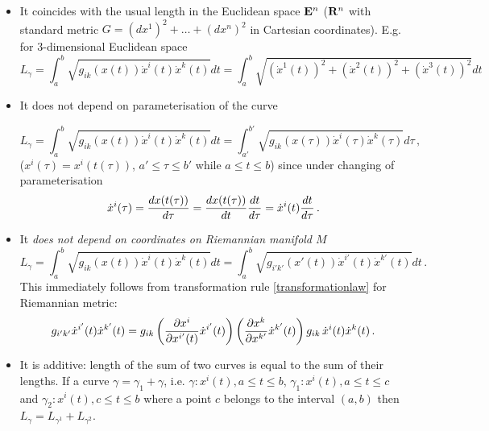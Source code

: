 \documentclass[12pt]{article}
\theoremstyle{theorem}
\numberwithin{equation}{section}
\begin{document}
\begin{itemize}

\item It coincides with the usual length in the Euclidean space ${\bf E}^n$
(${\bf R}^n$ with standard metric  $G=(dx^1)^2+\dots+(dx^n)^2$
in Cartesian coordinates). E.g. for $3$-dimensional Euclidean space
\begin{equation*}\label{coincidewithlength}
      L_\gamma=
  \int_a^b \sqrt {g_{ik}(x(t))\dot x^i(t) \dot x^k(t)}dt=
  \int_a^b \sqrt{(\dot x^1(t))^2+(\dot x^2(t))^2+(\dot x^3(t))^2}dt
\end{equation*}


\item It does not depend on parameterisation of the curve

\begin{equation*}\label{independenceon parameterisation}
    L_\gamma=  \int_a^b \sqrt {g_{ik}(x(t))\dot x^i(t) \dot x^k(t)}dt=
        \int_{a'}^{b'} \sqrt {g_{ik}(x(\tau))\dot x^i(\tau) \dot x^k(\tau)}
                 d\tau\,,
\end{equation*}
($x^i(\tau)=x^i(t(\tau))$,
$a'\leq \tau\leq b'$ while $a\leq t\leq b$) since under
changing of parameterisation
  $$
  \dot x^i(\tau)={dx(t(\tau))\over d\tau}=
  {dx(t(\tau))\over d t}{dt\over d\tau}=
  \dot x^i(t){dt\over d\tau}\,.
  $$


\item It {\it does not depend on coordinates on Riemannian manifold $M$}
 \begin{equation*}\label{independence on coordinates}
    L_\gamma=  \int_a^b \sqrt {g_{ik}(x(t))\dot x^i(t) \dot x^k(t)}dt=
    \int_a^b \sqrt {g_{i'k'}(x'(t))\dot x^{i'}(t) \dot x^{k'}(t)}dt\,.
 \end{equation*}
This immediately follows from transformation rule
\eqref{transformationlaw}  for Riemannian metric:
       $$
g_{i'k'}\dot x^{i'}(t) \dot x^{k'}(t)=
   g_{ik}
 \left({\partial x^i\over \partial x^{i'}(t)}\dot x^{i'}(t)\right)
 \left({\partial x^k\over \partial x^{k'}}\dot x^{k'}(t)\right)
    g_{ik}\,\dot x^{i}(t) \dot x^{k}(t)\,.
        $$
\item  It is additive: length of the sum of two curves is equal to the sum of
their lengths.
If a curve  $\gamma=\gamma_1+\gamma$, i.e.
$\gamma\colon x^i(t), a\leq t\leq b$,
$\gamma_1\colon x^i(t), a\leq t\leq c$ and
$\gamma_2\colon x^i(t), c\leq t\leq b$ where
a point $c$ belongs to the interval $(a,b)$ then
$L_{\gamma}=L_{\gamma^1}+L_{\gamma^2}$.

\end{itemize}
\end{document}
